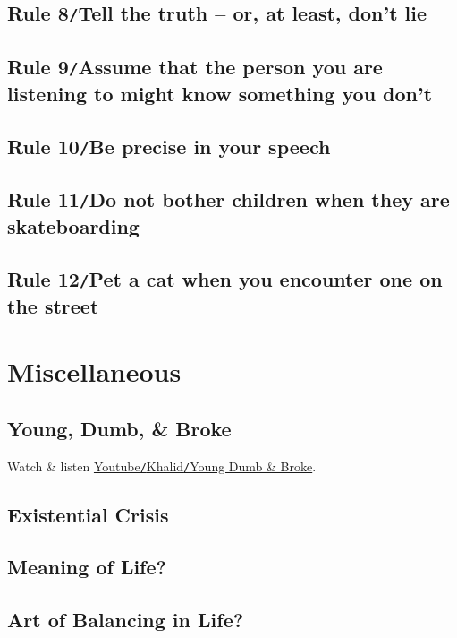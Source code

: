 \documentclass[oneside]{book}
\numberwithin{equation}{section}
\begin{document}
\section{Rule 8\texttt{/}Tell the truth -- or, at least, don't lie}

\section{Rule 9\texttt{/}Assume that the person you are listening to might know something you don't}

\section{Rule 10\texttt{/}Be precise in your speech}

\section{Rule 11\texttt{/}Do not bother children when they are skateboarding}

\section{Rule 12\texttt{/}Pet a cat when you encounter one on the street}


\chapter{Miscellaneous}

\section{Young, Dumb, \& Broke}
Watch \& listen \href{https://www.youtube.com/watch?v=IPfJnp1guPc}{Youtube\texttt{/}Khalid\texttt{/}Young Dumb \& Broke}.

\section{Existential Crisis}

\section{Meaning of Life?}

\section{Art of Balancing in Life?}
\end{document}
